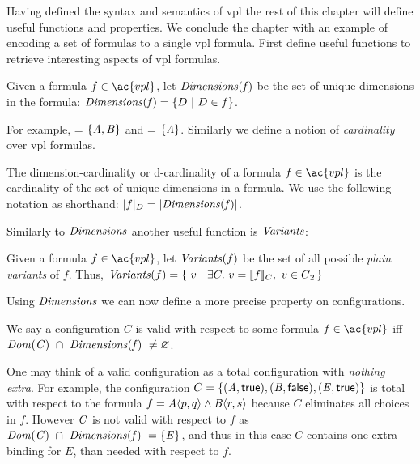 \label{section:vpl:formalism}
%
Having defined the syntax and semantics of \ac{vpl} the rest of this chapter
will define useful functions and properties. We conclude the chapter with an
example of encoding a set of \pl{} formulas to a single \ac{vpl} formula.
%
First define useful functions to retrieve interesting aspects of \ac{vpl}
formulas.

\begin{definition}[Dimensions]
  Given a formula $f \in \ac{vpl}$, let $\mathit{Dimensions(f)}$ be the set of unique
  dimensions in the formula:  $\mathit{Dimensions(f)} = \{ D\ |\ D \in f \}$.
\end{definition}

For example,  = $\{\mathit{A,B}\}$ and
 = $\{\mathit{A}\}$.
%
Similarly we define a notion of \emph{cardinality} over \ac{vpl} formulas.
%
\begin{definition}
  The dimension-cardinality or d-cardinality of a formula $f \in \ac{vpl}$ is
  the cardinality of the set of unique dimensions in a formula. We use the
  following notation as shorthand: $|f|_{D} = |{\mathit{Dimensions(f)}}|$.
\end{definition}

Similarly to $\mathit{Dimensions}$ another useful function is $\mathit{Variants}$:

\begin{definition}[Variants]
  Given a formula $f \in \ac{vpl}$, let $\mathit{Variants}(f)$ be the set of all
  possible \emph{plain variants} of $f$. Thus, $\variants{f} = \{\ v\ |\ \exists C.\
  v = \sem[C]{f},\ v \in \pl{} \,\}$
\end{definition}

Using $\mathit{Dimensions}$ we can now define a more precise property on
configurations.
%
\begin{definition}
  We say a configuration $C$ is valid with respect to some formula $f \in
  \ac{vpl}$ iff $\kf{Dom(C)}\ \cap\ \kf{Dimensions(\kf{f})\ \neq \varnothing}$.
\end{definition}

One may think of a valid configuration as a total configuration with
\emph{nothing extra}. For example, the configuration $C = \{\kf{(A,\true),
  (B,\false),(E,\true)}\}$ is total with respect to the formula $f =
\chc[A]{p,q}\wedge\chc[B]{r,s}$ because $C$ eliminates all choices in $f$.
However $\mathit{C}$ is not valid with respect to $f$ as $\mathit{Dom(C)}\ \cap\
\mathit{Dimensions(\mathit{f})\ = \{\mathit{E}\}}$, and thus in this case $C$ contains one
extra binding for $E$, than needed with respect to $f$.

